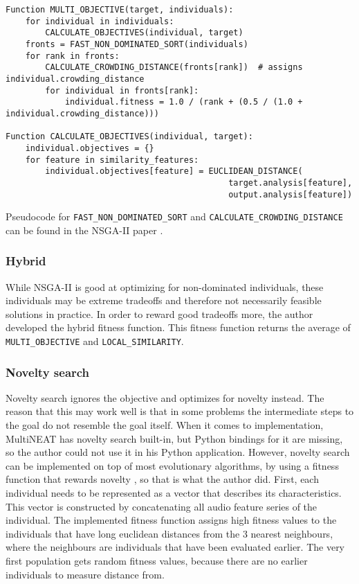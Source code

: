 \begin{Verbatim}[fontsize=\small]
Function MULTI_OBJECTIVE(target, individuals):
    for individual in individuals:
        CALCULATE_OBJECTIVES(individual, target)
    fronts = FAST_NON_DOMINATED_SORT(individuals)
    for rank in fronts:
        CALCULATE_CROWDING_DISTANCE(fronts[rank])  # assigns individual.crowding_distance
        for individual in fronts[rank]:
            individual.fitness = 1.0 / (rank + (0.5 / (1.0 + individual.crowding_distance)))

Function CALCULATE_OBJECTIVES(individual, target):
    individual.objectives = {}
    for feature in similarity_features:
        individual.objectives[feature] = EUCLIDEAN_DISTANCE(
                                             target.analysis[feature],
                                             output.analysis[feature])
\end{Verbatim}

Pseudocode for \texttt{FAST\_NON\_DOMINATED\_SORT} and \texttt{CALCULATE\_CROWDING\_DISTANCE} can be found in the NSGA-II paper \citep{nsga2}.

\subsubsection{Hybrid}
While NSGA-II is good at optimizing for non-dominated individuals, these individuals may be extreme tradeoffs and therefore not necessarily feasible solutions in practice. In order to reward good tradeoffs more, the author developed the hybrid fitness function. This fitness function returns the average of \texttt{MULTI\_OBJECTIVE} and \texttt{LOCAL\_SIMILARITY}.

\subsubsection{Novelty search}
Novelty search \citep{lehman2008} ignores the objective and optimizes for novelty instead. The reason that this may work well is that in some problems the intermediate steps to the goal do not resemble the goal itself. When it comes to implementation, MultiNEAT has novelty search built-in, but Python bindings for it are missing, so the author could not use it in his Python application. However, novelty search can be implemented on top of most evolutionary algorithms, by using a fitness function that rewards novelty \citep{noveltysearchwebsite}, so that is what the author did. First, each individual needs to be represented as a vector that describes its characteristics. This vector is constructed by concatenating all audio feature series of the individual. The implemented fitness function assigns high fitness values to the individuals that have long euclidean distances from the 3 nearest neighbours, where the neighbours are individuals that have been evaluated earlier. The very first population gets random fitness values, because there are no earlier individuals to measure distance from.

